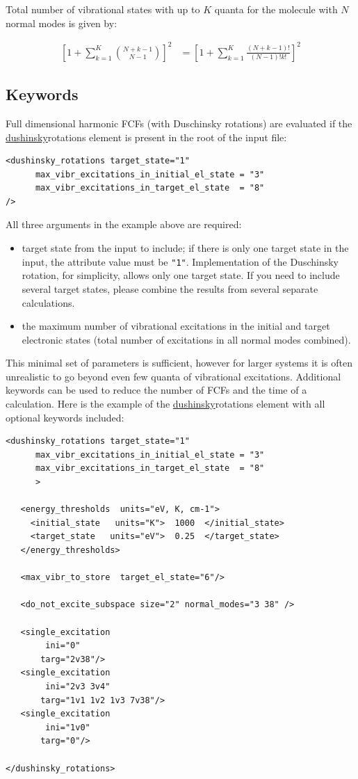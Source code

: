\documentclass[11pt]{article}
\begin{document}
Total number of vibrational states with up to $K$ quanta for the molecule with $N$ normal modes is
given by\cite{stars_and_bars}:

\begin{align}
\left[ 1+\sum_{k=1}^{K} {{N+k-1}\choose{N-1}} \right]^2&=\left[ 1+\sum_{k=1}^{K}\frac{(N+k-1)!}{(N-1)!k!} \right]^2
\end{align}



\subsection{Keywords}
\label{sec:dhush:keywords}

Full dimensional harmonic FCFs (with Duschinsky rotations) are evaluated
if the \ul{dushinsky}{rotations} element is present in the root of the input \xml file:
\begin{lstlisting}[frame=single,framerule=0pt]
<dushinsky_rotations target_state="1"
      max_vibr_excitations_in_initial_el_state = "3"
      max_vibr_excitations_in_target_el_state  = "8"
/>
\end{lstlisting}
All three arguments in the example above are required:
\begin{itemize}
\item target state from the input to include; 
if there is only one target state in the input, the attribute value must be {\tt "1"}.
Implementation of the Duschinsky rotation, for simplicity, allows only one target state.
If you need to include several target states, please combine the results from several separate calculations.
\item the maximum number of vibrational excitations in the initial and target electronic states
(total number of excitations in all normal modes combined).
\end{itemize}
This minimal set of parameters is sufficient, 
however for larger systems it is often unrealistic to go beyond even few quanta of vibrational excitations. 
Additional keywords can be used to reduce the number of FCFs and the time of a calculation. 
Here is the example of the \ul{dushinsky}{rotations} element with all optional keywords included:
\begin{lstlisting}[frame=single,framerule=0pt]
<dushinsky_rotations target_state="1"
      max_vibr_excitations_in_initial_el_state = "3"
      max_vibr_excitations_in_target_el_state  = "8"
      > 

   <energy_thresholds  units="eV, K, cm-1">
     <initial_state   units="K">  1000  </initial_state>
     <target_state   units="eV">  0.25  </target_state>
   </energy_thresholds>
  
   <max_vibr_to_store  target_el_state="6"/>

   <do_not_excite_subspace size="2" normal_modes="3 38" />

   <single_excitation 
        ini="0" 
       targ="2v38"/>
   <single_excitation 
        ini="2v3 3v4"  
       targ="1v1 1v2 1v3 7v38"/>
   <single_excitation 
        ini="1v0" 
       targ="0"/>

</dushinsky_rotations>
\end{lstlisting}
\end{document}
